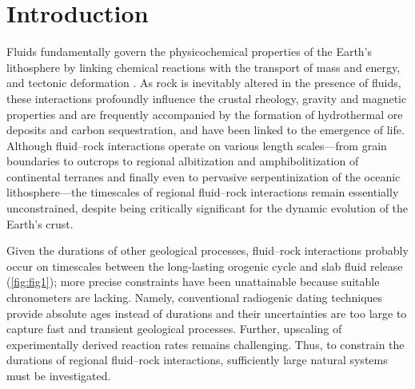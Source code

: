 
\section*{Introduction}

Fluids fundamentally govern the physicochemical properties of the Earth’s lithosphere by linking chemical reactions with the transport of mass and energy, and tectonic deformation \cite{Jamtveit2000} . As rock is inevitably altered in the presence of fluids, these interactions profoundly influence the crustal rheology\cite{Burgmann2008}, gravity and magnetic properties\cite{Tominaga2017,Maffione2014,Toft1990,Bostock2002} and are frequently accompanied by the formation of hydrothermal ore deposits\cite{Beinlich2019,Hedenquist1994} and carbon sequestration\cite{Kelemen2008}, and have been linked to the emergence of life\cite{Martin2008}. Although fluid–rock interactions operate on various length scales—from grain boundaries to outcrops to regional albitization and amphibolitization of continental terranes and finally even to pervasive serpentinization of the oceanic lithosphere\cite{Engvik2008}—the timescales of regional fluid–rock interactions remain essentially unconstrained, despite being critically significant for the dynamic evolution of the Earth’s crust.

Given the durations of other geological processes, fluid–rock interactions probably occur on timescales between the long-lasting orogenic cycle\cite{Meert2003,Viete2013,Whitney1999} and slab fluid release\cite{John2012,Taetz2018,Dragovic2015,Dragovic2018} (\ref{fig:fig1}); more precise constraints have been unattainable because suitable chronometers are lacking. Namely, conventional radiogenic dating techniques provide absolute ages instead of durations and their uncertainties are too large to capture fast and transient geological processes. Further, upscaling of experimentally derived reaction rates remains challenging\cite{Baxter2000,Cushman1986,White2003}. Thus, to constrain the durations of regional fluid–rock interactions, sufficiently large natural systems must be investigated.


